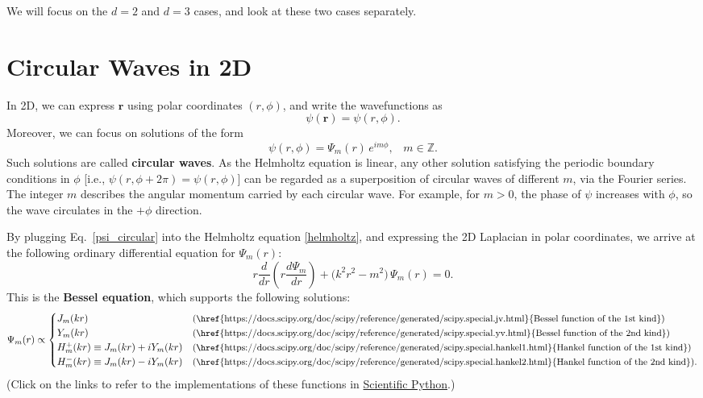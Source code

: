\documentclass[pra,12pt]{revtex4-2}
\begin{document}
We will focus on the $d = 2$ and $d = 3$ cases, and look at these two
cases separately.

\section{Circular Waves in 2D}
\label{circular_waves}

In 2D, we can express $\mathbf{r}$ using polar coordinates $(r,
\phi)$, and write the wavefunctions as
\begin{equation}
  \psi(\mathbf{r}) = \psi(r,\phi).
\end{equation}
Moreover, we can focus on solutions of the form
\begin{equation}
  \psi(r,\phi) = \Psi_m(r)\, e^{im\phi}, \;\;\;m \in\mathbb{Z}.
  \label{psi_circular}
\end{equation}
Such solutions are called \textbf{circular waves}.  As the Helmholtz
equation is linear, any other solution satisfying the periodic
boundary conditions in $\phi$ [i.e., $\psi(r,\phi + 2\pi) = \psi(r,
  \phi)$] can be regarded as a superposition of circular waves of
different $m$, via the Fourier series.  The integer $m$ describes the
angular momentum carried by each circular wave.  For example, for $m >
0$, the phase of $\psi$ increases with $\phi$, so the wave circulates
in the $+\phi$ direction.

By plugging Eq.~\eqref{psi_circular} into the Helmholtz equation
\eqref{helmholtz}, and expressing the 2D Laplacian in polar
coordinates, we arrive at the following ordinary differential equation
for $\Psi_m(r)$:
\begin{equation}
  r \frac{d}{dr}\!\left(r \frac{d\Psi_m}{dr} \right)
  + \Big(k^2 r^2 - m^2 \Big)\, \Psi_m(r) = 0.
  \label{besseleq}
\end{equation}
This is the \textbf{Bessel equation}, which supports the following
solutions:
\begin{equation}
  \Psi_m(r) \propto \begin{cases}
    J_m(kr) &\text{\small(\href{https://docs.scipy.org/doc/scipy/reference/generated/scipy.special.jv.html}{Bessel function of the 1st kind})} \\
    Y_m(kr) &\text{\small(\href{https://docs.scipy.org/doc/scipy/reference/generated/scipy.special.yv.html}{Bessel function of the 2nd kind})} \\
    H_m^+(kr) \equiv J_m(kr) + i Y_m(kr) &\text{\small(\href{https://docs.scipy.org/doc/scipy/reference/generated/scipy.special.hankel1.html}{Hankel function of the 1st kind})} \\
    H_m^-(kr) \equiv J_m(kr) - i Y_m(kr) &\text{\small(\href{https://docs.scipy.org/doc/scipy/reference/generated/scipy.special.hankel2.html}{Hankel function of the 2nd kind})}.
  \end{cases}
\end{equation}
(Click on the links to refer to the implementations of these functions
in \href{https://scipy.org/}{Scientific Python}.)
\end{document}
